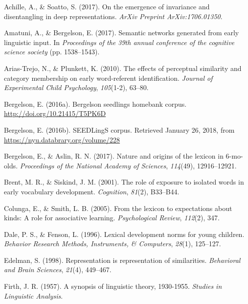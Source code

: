 \documentclass[10pt, letterpaper]{article}
\begin{document}
\setlength{\parindent}{-0.1in} \setlength{\leftskip}{0.125in} \noindent

\hypertarget{refs}{}
\hypertarget{ref-achille2017emergence}{}
Achille, A., \& Soatto, S. (2017). On the emergence of invariance and
disentangling in deep representations. \emph{ArXiv Preprint
ArXiv:1706.01350}.

\hypertarget{ref-amatuni2017semantic}{}
Amatuni, A., \& Bergelson, E. (2017). Semantic networks generated from
early linguistic input. In \emph{Proceedings of the 39th annual
conference of the cognitive science society} (pp. 1538--1543).

\hypertarget{ref-arias2010effects}{}
Arias-Trejo, N., \& Plunkett, K. (2010). The effects of perceptual
similarity and category membership on early word-referent
identification. \emph{Journal of Experimental Child Psychology},
\emph{105}(1-2), 63--80.

\hypertarget{ref-bergelson2016seedlings}{}
Bergelson, E. (2016a). Bergelson seedlings homebank corpus.
\url{http://doi.org/10.21415/T5PK6D}

\hypertarget{ref-bergelson2016seedlingsdatabrary}{}
Bergelson, E. (2016b). SEEDLingS corpus. Retrieved January 26, 2018,
from \url{https://nyu.databrary.org/volume/228}

\hypertarget{ref-bergelson2017nature}{}
Bergelson, E., \& Aslin, R. N. (2017). Nature and origins of the lexicon
in 6-mo-olds. \emph{Proceedings of the National Academy of Sciences},
\emph{114}(49), 12916--12921.

\hypertarget{ref-brent2001role}{}
Brent, M. R., \& Siskind, J. M. (2001). The role of exposure to isolated
words in early vocabulary development. \emph{Cognition}, \emph{81}(2),
B33--B44.

\hypertarget{ref-colunga2005lexicon}{}
Colunga, E., \& Smith, L. B. (2005). From the lexicon to expectations
about kinds: A role for associative learning. \emph{Psychological
Review}, \emph{112}(2), 347.

\hypertarget{ref-dale1996lexical}{}
Dale, P. S., \& Fenson, L. (1996). Lexical development norms for young
children. \emph{Behavior Research Methods, Instruments, \& Computers},
\emph{28}(1), 125--127.

\hypertarget{ref-edelman1998representation}{}
Edelman, S. (1998). Representation is representation of similarities.
\emph{Behavioral and Brain Sciences}, \emph{21}(4), 449--467.

\hypertarget{ref-firth1957synopsis}{}
Firth, J. R. (1957). A synopsis of linguistic theory, 1930-1955.
\emph{Studies in Linguistic Analysis}.
\end{document}
